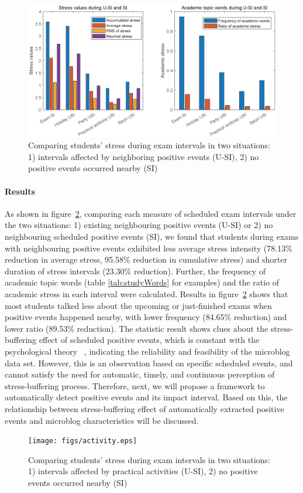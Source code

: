 \begin{figure}[h]
\centering
\includegraphics[width=\linewidth]{figs/barUSI.eps}
\caption{\small{Comparing students' stress during exam intervals in two situations:
1) intervals affected by neighboring positive events (U-SI), 2) no positive events occurred nearby (SI)}}
\label{fig:frequency}
\end{figure}

\paragraph{Results}
As shown in figure~\ref{fig:frequency},
comparing each measure of scheduled exam intervals under the two situations:
1) existing neighbouring positive events (U-SI) or 2) no neighbouring scheduled positive events (SI),
we found that students during exams with neighbouring positive events exhibited less average stress intensity
(78.13\% reduction in average stress, 95.58\%  reduction in cumulative stress)
and shorter duration of stress intervals (23.30\% reduction).
Further, the frequency of academic topic words (table \ref{tab:studyWords} for examples)
and the ratio of academic stress in each interval were calculated.
Results in figure~\ref{fig:frequency} shows that most students talked less about the upcoming or just-finished exams when positive events happened nearby,
with lower frequency (84.65\% reduction) and lower ratio (89.53\% reduction).
The statistic result shows clues about the stress-buffering effect of scheduled positive events,
which is constant with the psychological theory ~\citep{Cohen1984Positive, Cohen2010Positive, Needles1990Positive},
indicating the reliability and feasibility of the microblog data set.
However,
this is an observation based on specific scheduled events,
and cannot satisfy the need for automatic, timely, and continuous perception of stress-buffering process.
Therefore, next, we will propose a framework to automatically detect positive events and its impact interval.
Based on this,
the relationship between stress-buffering effect of automatically extracted positive events and
microblog characteristics will be discussed.


\begin{figure}[h]
\centering
\texttt{[image: figs/activity.eps]}
\caption{\small{Comparing students' stress during exam intervals in two situations:
1) intervals affected by practical activities (U-SI), 2) no positive events occurred nearby (SI)}}
\label{fig:frequency}
\end{figure}
